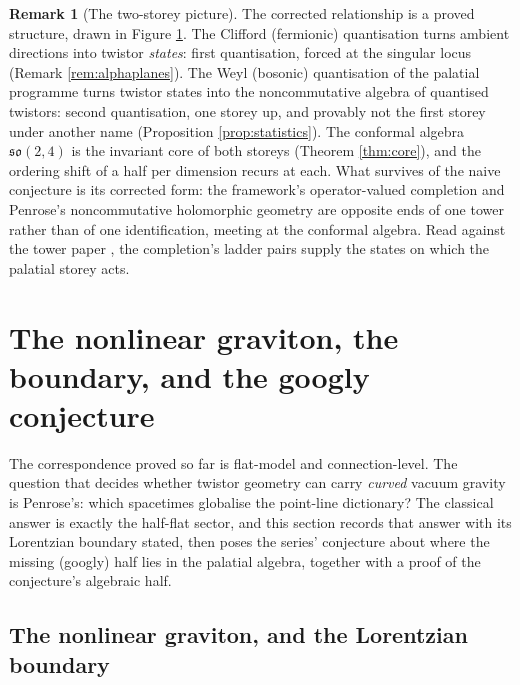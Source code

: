 \documentclass[11pt]{article}
\theoremstyle{definition}
\newtheorem{remark}[theorem]{Remark}
\begin{document}
\begin{figure}[t]
\label{fig:twostorey}
\end{figure}

\begin{remark}[The two-storey picture]\label{rem:twostorey}
The corrected relationship is a proved structure, drawn in Figure \ref{fig:twostorey}. The Clifford (fermionic) quantisation turns ambient directions into twistor \emph{states}: first quantisation, forced at the singular locus (Remark \ref{rem:alphaplanes}). The Weyl (bosonic) quantisation of the palatial programme turns twistor states into the noncommutative algebra of quantised twistors: second quantisation, one storey up, and provably not the first storey under another name (Proposition \ref{prop:statistics}). The conformal algebra $\mathfrak{so}(2,4)$ is the invariant core of both storeys (Theorem \ref{thm:core}), and the ordering shift of a half per dimension recurs at each. What survives of the naive conjecture is its corrected form: the framework's operator-valued completion and Penrose's noncommutative holomorphic geometry are opposite ends of one tower rather than of one identification, meeting at the conformal algebra. Read against the tower paper \cite{ButlerT3}, the completion's ladder pairs supply the states on which the palatial storey acts.
\end{remark}

\section{The nonlinear graviton, the boundary, and the googly conjecture}\label{sec:googly}

The correspondence proved so far is flat-model and connection-level. The question that decides whether twistor geometry can carry \emph{curved} vacuum gravity is Penrose's: which spacetimes globalise the point-line dictionary? The classical answer is exactly the half-flat sector, and this section records that answer with its Lorentzian boundary stated, then poses the series' conjecture about where the missing (googly) half lies in the palatial algebra, together with a proof of the conjecture's algebraic half.

\subsection{The nonlinear graviton, and the Lorentzian boundary}\label{subsec:graviton}
\end{document}
